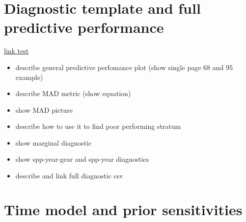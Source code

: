 \documentclass[12pt]{article}
\begin{document}

%
\clearpage
%
\section{Diagnostic template and full predictive performance}



\href{https://github.com/gasduster99/sppComp/blob/master/try1/postSSC/95619831990M3.5/sppMad68.pdf}{link test}

\begin{itemize}
	\item describe general predictive perfomance plot (show single page 68 and 95 example)
	\item describe MAD metric (show equation)
	\item show MAD picture
	\item describe how to use it to find poor performing stratum
	\item show marginal diagnostic
	\item show spp-year-gear and spp-year diagnostics
	\item describe and link full diagnostic csv
\end{itemize}

%
\clearpage
%
\section{Time model and prior sensitivities}
\end{document}

